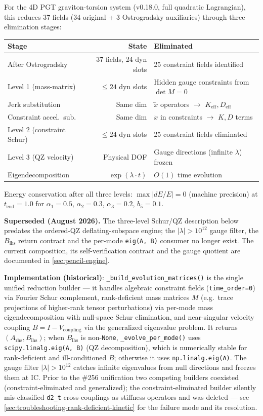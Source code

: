For the 4D PGT graviton-torsion system (v0.18.0, full quadratic Lagrangian), this reduces 37 fields (34 original + 3 Ostrogradsky auxiliaries) through three elimination stages:

\begin{center}
\begin{tabular}{@{}lrl@{}}
\toprule
Stage & State & Eliminated \\
\midrule
After Ostrogradsky & 37 fields, 24 dyn slots & 25 constraint fields identified \\
Level 1 (mass-matrix) & $\leq 24$ dyn slots & Hidden gauge constraints from $\det M = 0$ \\
Jerk substitution & Same dim & $\dddot{x}$ operators $\to$ $K_\text{eff}, D_\text{eff}$ \\
Constraint accel.\ sub. & Same dim & $\ddot{x}$ in constraints $\to$ $K, D$ terms \\
Level 2 (constraint Schur) & $\leq 24$ dyn slots & 25 constraint fields eliminated \\
Level 3 (QZ velocity) & Physical DOF & Gauge directions (infinite $\lambda$) frozen \\
Eigendecomposition & $\exp(\lambda \cdot t)$ & $O(1)$ time evolution \\
\bottomrule
\end{tabular}
\end{center}

Energy conservation after all three levels: $\max|dE/E| = 0$ (machine precision) at $t_\text{end} = 1.0$ for $\alpha_1 = 0.5$, $\alpha_2 = 0.3$, $\alpha_3 = 0.2$, $b_5 = 0.1$.

\textbf{Superseded (August 2026).} The three-level Schur/QZ description
below predates the ordered-QZ deflating-subspace engine; the
$|\lambda| > 10^{12}$ gauge filter, the $B_\text{lhs}$ return contract
and the per-mode \texttt{eig(A, B)} consumer no longer exist. The current
composition, its self-verification contract and the gauge quotient are
documented in \cref{sec:pencil-engine}.

\textbf{Implementation (historical)}: \texttt{\_build\_evolution\_matrices()} is the single unified reduction builder --- it handles algebraic constraint fields (\texttt{time\_order=0}) via Fourier Schur complement, rank-deficient mass matrices $M$ (e.g.\ trace projections of higher-rank tensor perturbations) via per-mode mass eigendecomposition with null-space Schur elimination, and near-singular velocity coupling $B = I - V_\text{coupling}$ via the generalized eigenvalue problem. It returns $(A_\text{rhs}, B_\text{lhs})$; when $B_\text{lhs}$ is non-\texttt{None}, \texttt{\_evolve\_per\_mode()} uses \texttt{scipy.linalg.eig(A, B)} (QZ decomposition), which is numerically stable for rank-deficient and ill-conditioned $B$; otherwise it uses \texttt{np.linalg.eig(A)}. The gauge filter $|\lambda| > 10^{12}$ catches infinite eigenvalues from null directions and freezes them at IC. Prior to the \#256 unification two competing builders coexisted (constraint-eliminated and generalized); the constraint-eliminated builder silently mis-classified \texttt{d2\_t} cross-couplings as stiffness operators and was deleted --- see \cref{sec:troubleshooting-rank-deficient-kinetic} for the failure mode and its resolution.

